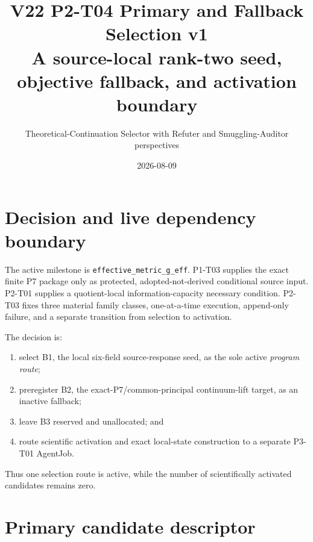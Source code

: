 \documentclass[11pt]{article}
\title{V22 P2-T04 Primary and Fallback Selection v1\\
\large A source-local rank-two seed, objective fallback, and activation boundary}
\author{Theoretical-Continuation Selector with Refuter and Smuggling-Auditor perspectives}
\date{2026-08-09}
\begin{document}
\sloppy
\maketitle

\begin{center}
\end{center}

\section{Decision and live dependency boundary}

The active milestone is \texttt{effective\_metric\_g\_eff}. P1-T03 supplies
the exact finite P7 package only as protected, adopted-not-derived conditional
source input. P2-T01 supplies a quotient-local information-capacity necessary
condition. P2-T03 fixes three material family classes, one-at-a-time execution,
append-only failure, and a separate transition from selection to activation.

The decision is:
\begin{enumerate}
  \item select B1, the local six-field source-response seed, as the sole active
  \emph{program route};
  \item preregister B2, the exact-P7/common-principal continuum-lift target, as
  an inactive fallback;
  \item leave B3 reserved and unallocated; and
  \item route scientific activation and exact local-state construction to a
  separate P3-T01 AgentJob.
\end{enumerate}
Thus one selection route is active, while the number of scientifically
activated candidates remains zero.

\section{Primary candidate descriptor}
\end{document}
